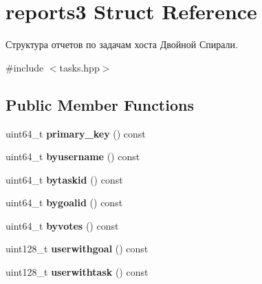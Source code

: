 \hypertarget{structreports3}{}\section{reports3 Struct Reference}
\label{structreports3}


Структура отчетов по задачам хоста Двойной Спирали.  




{\ttfamily \#include $<$tasks.\+hpp$>$}

\subsection*{Public Member Functions}
\begin{DoxyCompactItemize}
\item 
\mbox{\label{structreports3_ae691681169805ec57fd02ca779910ed8}} 
uint64\+\_\+t {\bfseries primary\+\_\+key} () const
\item 
\mbox{\label{structreports3_a52ab0b2d834ca584b53975e93542f971}} 
uint64\+\_\+t {\bfseries byusername} () const
\item 
\mbox{\label{structreports3_a38d535110bebc76376c8d952b18a6186}} 
uint64\+\_\+t {\bfseries bytaskid} () const
\item 
\mbox{\label{structreports3_afd6b06bd9d6a1575f6d37829b132469b}} 
uint64\+\_\+t {\bfseries bygoalid} () const
\item 
\mbox{\label{structreports3_aa654e06d991a5e57e3b8e7928c0eed98}} 
uint64\+\_\+t {\bfseries byvotes} () const
\item 
\mbox{\label{structreports3_ae6b51354e281bfc71d174fb207699afa}} 
uint128\+\_\+t {\bfseries userwithgoal} () const
\item 
\mbox{\label{structreports3_a0944b5d06f8d2c9449dcf7d04f0534e1}} 
uint128\+\_\+t {\bfseries userwithtask} () const
\end{DoxyCompactItemize}
